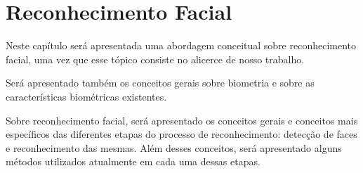 	

\chapter{Reconhecimento Facial}

	Neste capítulo será apresentada uma abordagem conceitual sobre reconhecimento facial, uma vez que esse tópico consiste no alicerce de nosso trabalho. 

	Será apresentado também os conceitos gerais sobre biometria e sobre as características biométricas existentes.

	Sobre reconhecimento facial, será apresentado os conceitos gerais e conceitos mais específicos das diferentes etapas do processo de reconhecimento: detecção de faces e reconhecimento das mesmas. Além desses conceitos, será apresentado alguns métodos utilizados atualmente em cada uma dessas etapas.


	
	





























